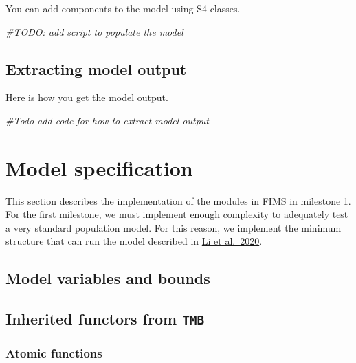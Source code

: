 \documentclass[
]{book}
\newenvironment{Shaded}{\begin{snugshade}}{\end{snugshade}}
\newcommand{\CommentTok}[1]{\textcolor[rgb]{0.56,0.35,0.01}{\textit{#1}}}
\begin{document}
You can add components to the model using S4 classes.

\begin{Shaded}
\begin{Highlighting}[]
\CommentTok{\#TODO: add script to populate the model}
\end{Highlighting}
\end{Shaded}

\hypertarget{extracting-model-output}{%
\section{Extracting model output}\label{extracting-model-output}}

Here is how you get the model output.

\begin{Shaded}
\begin{Highlighting}[]
\CommentTok{\#Todo add code for how to extract model output}
\end{Highlighting}
\end{Shaded}

\hypertarget{model-specification}{%
\chapter{Model specification}\label{model-specification}}

This section describes the implementation of the modules in FIMS in milestone 1. For the first milestone, we must implement enough complexity to adequately test a very standard population model. For this reason, we implement the minimum structure that can run the model described in \href{}{Li et al.~2020}.

\hypertarget{model-variables-and-bounds}{%
\section{Model variables and bounds}\label{model-variables-and-bounds}}

\hypertarget{inherited-functors-from-tmb}{%
\section{\texorpdfstring{Inherited functors from \texttt{TMB}}{Inherited functors from TMB}}\label{inherited-functors-from-tmb}}

\hypertarget{atomic-functions}{%
\subsection{Atomic functions}\label{atomic-functions}}
\end{document}
